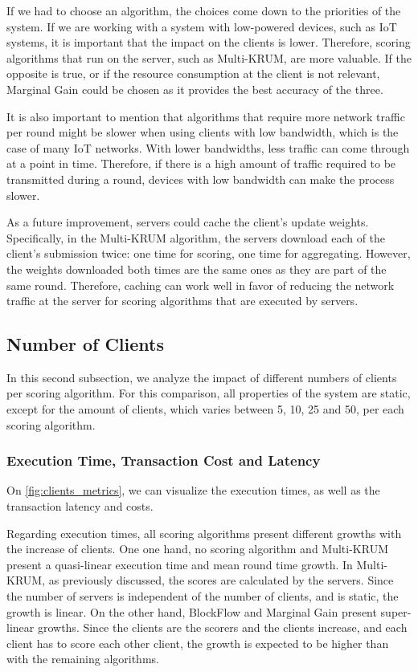If we had to choose an algorithm, the choices come down to the priorities of the system. If we are working with a system with low-powered devices, such as IoT systems, it is important that the impact on the clients is lower. Therefore, scoring algorithms that run on the server, such as Multi-KRUM, are more valuable. If the opposite is true, or if the resource consumption at the client is not relevant, Marginal Gain could be chosen as it provides the best accuracy of the three.

It is also important to mention that algorithms that require more network traffic per round might be slower when using clients with low bandwidth, which is the case of many IoT networks. With lower bandwidths, less traffic can come through at a point in time. Therefore, if there is a high amount of traffic required to be transmitted during a round, devices with low bandwidth can make the process slower.

As a future improvement, servers could cache the client's update weights. Specifically, in the Multi-KRUM algorithm, the servers download each of the client's submission twice: one time for scoring, one time for aggregating. However, the weights downloaded both times are the same ones as they are part of the same round. Therefore, caching can work well in favor of reducing the network traffic at the server for scoring algorithms that are executed by servers.

\subsection{Number of Clients}\label{horizontal:number_of_clients}

In this second subsection, we analyze the impact of different numbers of clients per scoring algorithm. For this comparison, all properties of the system are static, except for the amount of clients, which varies between 5, 10, 25 and 50, per each scoring algorithm.

\subsubsection{Execution Time, Transaction Cost and Latency}

On \autoref{fig:clients_metrics}, we can visualize the execution times, as well as the transaction latency and costs.

Regarding execution times, all scoring algorithms present different growths with the increase of clients. One one hand, no scoring algorithm and Multi-KRUM present a quasi-linear execution time and mean round time growth. In Multi-KRUM, as previously discussed, the scores are calculated by the servers. Since the number of servers is independent of the number of clients, and is static, the growth is linear. On the other hand, BlockFlow and Marginal Gain present super-linear growths. Since the clients are the scorers and the clients increase, and each client has to score each other client, the growth is expected to be higher than with the remaining algorithms.

